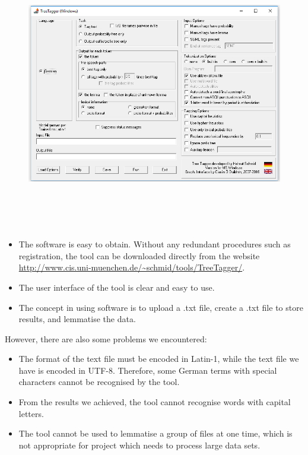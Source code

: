 \begin{figure}[H]
	\centering	
	\includegraphics[width=16cm, height=12cm]{Figs/TreeTaggerInterface}\\[1ex]
	\caption{}
	\label{fig:treeTaggerUI}
\end{figure} 

\begin{itemize}
	\item \textbf{} The software is easy to obtain. Without any redundant procedures such as registration, the tool can be downloaded directly from the website \url{http://www.cis.uni-muenchen.de/~schmid/tools/TreeTagger/}.
	\item \textbf{} The user interface of the tool is clear and easy to use.
	\item \textbf{} The concept in using software is to upload a .txt file, create a .txt file to store results, and lemmatise the data.	
\end{itemize}

However, there are also some problems we encountered:
\begin{itemize}
	\item \textbf{} The format of the text file must be encoded in Latin-1, while the text file we have is encoded in UTF-8. Therefore, some German terms with special characters cannot be recognised by the tool.
	\item \textbf{} From the results we achieved, the tool cannot recognise words with capital letters. 
	\item \textbf{} The tool cannot be used to lemmatise a group of files at one time, which is not appropriate for project which needs to process large data sets. 	
\end{itemize}

